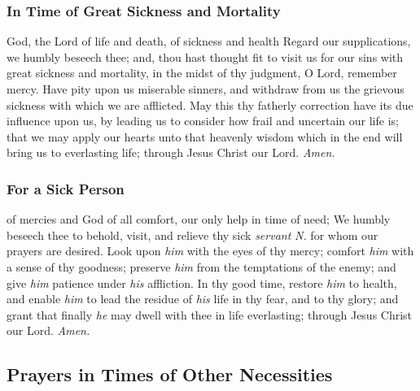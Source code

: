 \subsubsection{In Time of Great Sickness and Mortality}
 God, the Lord of life and death, of sickness and health Regard our supplications, we humbly beseech thee; and, thou hast thought fit to visit us for our sins with great sickness and mortality, in the midst of thy judgment, O Lord, remember mercy. Have pity upon us miserable sinners, and withdraw from us the grievous sickness with which we are afflicted. May this thy fatherly correction have its due influence upon us, by leading us to consider how frail and uncertain our life is; that we may apply our hearts unto that heavenly wisdom which in the end will bring us to everlasting life; through Jesus Christ our Lord. \textit{Amen.}

\subsubsection{For a Sick Person}

 of mercies and God of all comfort, our only help in time of need; We humbly beseech thee to behold, visit, and relieve thy sick \textit{servant} \textit{N.} for whom our prayers are desired. Look upon \textit{him} with the eyes of thy mercy; comfort \textit{him} with a sense of thy goodness; preserve \textit{him} from the temptations of the enemy; and give \textit{him} patience under \textit{his} affliction. In thy good time, restore \textit{him} to health, and enable \textit{him} to lead the residue of \textit{his} life in thy fear, and to thy glory; and grant that finally \textit{he} may dwell with thee in life everlasting; through Jesus Christ our Lord. \textit{Amen.}


\subsection{Prayers in Times of Other Necessities}

